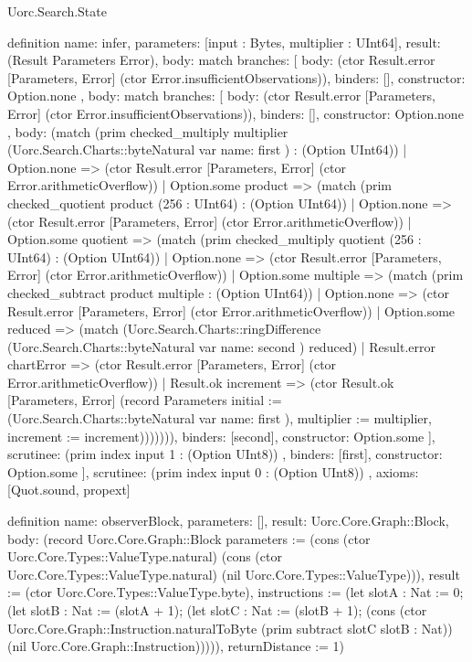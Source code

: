 \begin{lexlean}{Uorc.Search.State}
\begin{semanticmodule}
definition{
  name: infer,
  parameters: [input : Bytes, multiplier : UInt64],
  result: (Result Parameters Error),
  body: match{
    branches: [
      {
        body: (ctor Result.error [Parameters, Error] (ctor Error.insufficientObservations)),
        binders: [],
        constructor: Option.none
      },
      {
        body: match{
          branches: [
            {
              body: (ctor Result.error [Parameters, Error] (ctor Error.insufficientObservations)),
              binders: [],
              constructor: Option.none
            },
            {
              body: (match (prim checked_multiply multiplier (Uorc.Search.Charts::byteNatural var{
                  name: first
                }) : (Option UInt64))
                | Option.none => (ctor Result.error [Parameters, Error] (ctor Error.arithmeticOverflow))
                | Option.some product => (match (prim checked_quotient product (256 : UInt64) : (Option UInt64))
                  | Option.none => (ctor Result.error [Parameters, Error] (ctor Error.arithmeticOverflow))
                  | Option.some quotient => (match (prim checked_multiply quotient (256 : UInt64) : (Option UInt64))
                    | Option.none => (ctor Result.error [Parameters, Error] (ctor Error.arithmeticOverflow))
                    | Option.some multiple => (match (prim checked_subtract product multiple : (Option UInt64))
                      | Option.none => (ctor Result.error [Parameters, Error] (ctor Error.arithmeticOverflow))
                      | Option.some reduced => (match (Uorc.Search.Charts::ringDifference (Uorc.Search.Charts::byteNatural var{
                          name: second
                        }) reduced)
                        | Result.error chartError => (ctor Result.error [Parameters, Error] (ctor Error.arithmeticOverflow))
                        | Result.ok increment => (ctor Result.ok [Parameters, Error] (record Parameters {initial := (Uorc.Search.Charts::byteNatural var{
                          name: first
                        }), multiplier := multiplier, increment := increment}))))))),
              binders: [second],
              constructor: Option.some
            }
          ],
          scrutinee: (prim index input 1 : (Option UInt8))
        },
        binders: [first],
        constructor: Option.some
      }
    ],
    scrutinee: (prim index input 0 : (Option UInt8))
  },
  axioms: [Quot.sound, propext]
}

definition{
  name: observerBlock,
  parameters: [],
  result: Uorc.Core.Graph::Block,
  body: (record Uorc.Core.Graph::Block {parameters := (cons (ctor Uorc.Core.Types::ValueType.natural) (cons (ctor Uorc.Core.Types::ValueType.natural) (nil Uorc.Core.Types::ValueType))), result := (ctor Uorc.Core.Types::ValueType.byte), instructions := (let slotA : Nat := 0; (let slotB : Nat := (slotA + 1); (let slotC : Nat := (slotB + 1); (cons (ctor Uorc.Core.Graph::Instruction.naturalToByte (prim subtract slotC slotB : Nat)) (nil Uorc.Core.Graph::Instruction))))), returnDistance := 1})
}


\end{semanticmodule}
\end{lexlean}
